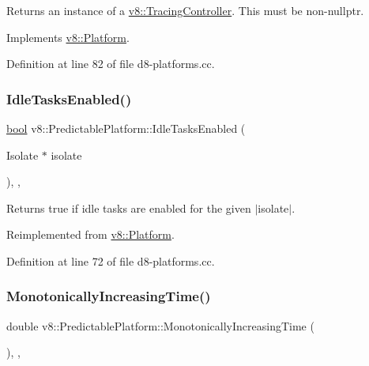 Returns an instance of a \mbox{\hyperlink{classv8_1_1TracingController}{v8\+::\+Tracing\+Controller}}. This must be non-\/nullptr. 

Implements \mbox{\hyperlink{classv8_1_1Platform_aa760c7bf8c46495eb650d2be72399747}{v8\+::\+Platform}}.



Definition at line 82 of file d8-\/platforms.\+cc.

\mbox{\label{classv8_1_1PredictablePlatform_ad79dbc4e7ebdbbe1c3cc90872161f845}} 
\subsubsection{\texorpdfstring{Idle\+Tasks\+Enabled()}{IdleTasksEnabled()}}
{\footnotesize\ttfamily \mbox{\hyperlink{classbool}{bool}} v8\+::\+Predictable\+Platform\+::\+Idle\+Tasks\+Enabled (\begin{DoxyParamCaption}\item[{Isolate $\ast$}]{isolate }\end{DoxyParamCaption})\hspace{0.3cm}{\ttfamily [inline]}, {\ttfamily [override]}, {\ttfamily [virtual]}}

Returns true if idle tasks are enabled for the given $\vert$isolate$\vert$. 

Reimplemented from \mbox{\hyperlink{classv8_1_1Platform_ad229642bf16a066d2e8d866dc128141e}{v8\+::\+Platform}}.



Definition at line 72 of file d8-\/platforms.\+cc.

\mbox{\label{classv8_1_1PredictablePlatform_a5ea9a10dff864d311e3612ec340a6710}} 
\subsubsection{\texorpdfstring{Monotonically\+Increasing\+Time()}{MonotonicallyIncreasingTime()}}
{\footnotesize\ttfamily double v8\+::\+Predictable\+Platform\+::\+Monotonically\+Increasing\+Time (\begin{DoxyParamCaption}{ }\end{DoxyParamCaption})\hspace{0.3cm}{\ttfamily [inline]}, {\ttfamily [override]}, {\ttfamily [virtual]}}

